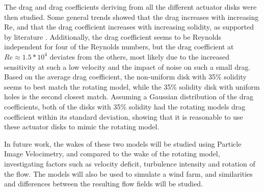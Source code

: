 The drag and drag coefficients deriving from all the different actuator disks were then studied. Some general trends showed that the drag increases with increasing Re, and that the drag coefficient increases with increasing solidity, as supported by literature \cite{Lignarolo2016}. Additionally, the drag coefficient seems to be Reynolds independent for four of the Reynolds numbers, but the drag coefficient at $Re \approx 1.5*10^4$ deviates from the others, most likely due to the increased sensitivity at such a low velocity and the impact of noise on such a small drag. Based on the average drag coefficient, the non-uniform disk with 35\% solidity seems to best match the rotating model, while the 35\% solidity disk with uniform holes is the second closest match. Assuming a Gaussian distribution of the drag coefficients, both of the disks with 35\% solidity had the rotating models drag coefficient within its standard deviation, showing that it is reasonable to use these actuator disks to mimic the rotating model. 


In future work, the wakes of these two models will be studied using Particle Image Velocimetry, and compared to the wake of the rotating model, investigating factors such as velocity deficit, turbulence intensity and rotation of the flow. The models will also be used to simulate a wind farm, and similarities and differences between the resulting flow fields will be studied. 















  
